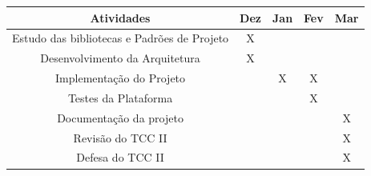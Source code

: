 	\begin{quadro}[h]
		\caption{Cronograma de Atividades TCC II - Dez/2022 a Mar/2023}
		\centering
		\begin{tabular}{c c c c c} \hline
			\label{quad:cronograma-atividades}
			\textbf{Atividades}                         & \textbf{Dez} & \textbf{Jan} & \textbf{Fev} & \textbf{Mar} \\ \hline
			Estudo das bibliotecas e Padrões de Projeto & X            &              &              &              \\ \hline
			Desenvolvimento da Arquitetura              & X            &              &              &              \\ \hline
			Implementação do Projeto                    &              & X            & X            &              \\ \hline
			Testes da Plataforma                        &              &              & X            &              \\ \hline
			Documentação da projeto                     &              &              &              & X            \\ \hline
			Revisão do TCC II                           &              &              &              & X            \\ \hline
			Defesa do TCC II                            &              &              &              & X            \\ \hline
		\end{tabular}
	\end{quadro}
